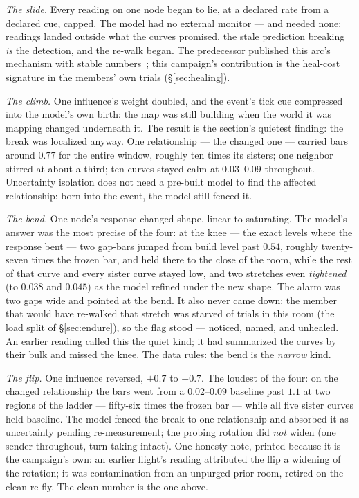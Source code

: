 \documentclass[11pt,a4paper]{article}
\begin{document}
\emph{The slide.} Every reading on one node began to lie, at a
declared rate from a declared cue, capped. The model had no external
monitor --- and needed none: readings landed outside what the curves
promised, the stale prediction breaking \emph{is} the detection, and
the re-walk began. The predecessor published this arc's mechanism
with stable numbers~\cite{p4}; this campaign's contribution is the
heal-cost signature in the members' own trials
(\S\ref{sec:healing}).

\emph{The climb.} One influence's weight doubled, and the event's
tick cue compressed into the model's own birth: the map was still
building when the world it was mapping changed underneath it. The
result is the section's quietest finding: the break was localized
anyway. One relationship --- the changed one --- carried bars around
$0.77$ for the entire window, roughly ten times its sisters; one
neighbor stirred at about a third; ten curves stayed calm at
$0.03$--$0.09$ throughout. Uncertainty isolation does not need a
pre-built model to find the affected relationship: born into the
event, the model still fenced it.

\emph{The bend.} One node's response changed shape, linear to
saturating. The model's answer was the most precise of the four: at
the knee --- the exact levels where the response bent --- two gap-bars
jumped from build level past $0.54$, roughly twenty-seven times the
frozen bar, and held there to the close of the room, while the rest
of that curve and every sister curve stayed low, and two stretches
even \emph{tightened} (to $0.038$ and $0.045$) as the model refined
under the new shape. The alarm was two gaps wide and pointed at the
bend. It also never came down: the member that would have re-walked
that stretch was starved of trials in this room (the load split of
\S\ref{sec:endure}), so the flag stood --- noticed, named, and
unhealed. An earlier reading called this the quiet kind; it had
summarized the curves by their bulk and missed the knee. The data
rules: the bend is the \emph{narrow} kind.

\emph{The flip.} One influence reversed, $+0.7$ to $-0.7$. The
loudest of the four: on the changed relationship the bars went from
a $0.02$--$0.09$ baseline past $1.1$ at two regions of the ladder
--- fifty-six times the frozen bar --- while all five sister curves
held baseline. The model fenced the break to one relationship and
absorbed it as uncertainty pending re-measurement; the probing
rotation did \emph{not} widen (one sender throughout, turn-taking
intact). One honesty note, printed because it is the campaign's own:
an earlier flight's reading attributed the flip a widening of the
rotation; it was contamination from an unpurged prior room, retired
on the clean re-fly. The clean number is the one above.
\end{document}
